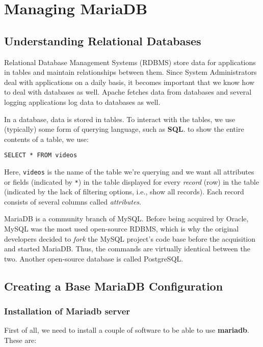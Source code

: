 \chapter{Managing MariaDB}

\section{Understanding Relational Databases}
Relational Database Management Systems (RDBMS) store data for applications in tables and maintain relationships between them. Since System Administrators deal with applications on a daily basis, it becomes important that we know how to deal with databases as well. Apache fetches data from databases and several logging applications log data to databases as well. 

In a database, data is stored in tables. To interact with the tables, we use (typically) some form of querying language, such as \textbf{SQL}. to show the entire contents of a table, we use:

\vspace{-15pt}
\begin{verbatim}
SELECT * FROM videos
\end{verbatim}
\vspace{-10pt}	

\noindent
Here, \verb|videos| is the name of the table we're querying and we want all attributes or fields (indicated by \verb|*|) in the table displayed for every \textit{record} (row) in the table (indicated by the lack of filtering options, i.e., show all records). Each record consists of several columns called \textit{attributes}.

MariaDB is a community branch of MySQL. Before being acquired by Oracle, MySQL was the most used open-source RDBMS, which is why the original developers decided to \textit{fork} the MySQL project's code base before the acquisition and started MariaDB. Thus, the commands are virtually identical between the two. Another open-source database is called PostgreSQL. 

\section{Creating a Base MariaDB Configuration}
\subsection{Installation of Mariadb server}
First of all, we need to install a couple of software to be able to use \textbf{mariadb}. These are:

